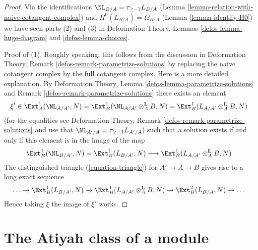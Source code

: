\begin{proof}
Via the identifications $\NL_{B/A} = \tau_{\geq -1}L_{B/A}$
(Lemma \ref{lemma-relation-with-naive-cotangent-complex}) and
$H^0(L_{B/A}) = \Omega_{B/A}$ (Lemma \ref{lemma-identify-H0})
we have seen parts (2) and (3) in
Deformation Theory, Lemmas \ref{defos-lemma-huge-diagram} and
\ref{defos-lemma-choices}.

\medskip\noindent
Proof of (1). Roughly speaking, this follows from the discussion in 
Deformation Theory, Remark \ref{defos-remark-parametrize-solutions}
by replacing the naive cotangent complex by the full cotangent complex.
Here is a more detailed explanation. By
Deformation Theory, Lemma \ref{defos-lemma-parametrize-solutions}
and Remark \ref{defos-remark-parametrize-solutions}
there exists an element
$$
\xi' \in
\Ext^1_A(\NL_{A/A'}, N) =
\Ext^1_B(\NL_{A/A'} \otimes_A^\mathbf{L} B, N) =
\Ext^1_B(L_{A/A'} \otimes_A^\mathbf{L} B, N)
$$
(for the equalities see Deformation Theory, Remark
\ref{defos-remark-parametrize-solutions} and use that
$\NL_{A'/A} = \tau_{\geq -1} L_{A'/A}$)
such that a solution exists if and only if this element is in
the image of the map
$$
\Ext^1_B(\NL_{B/A'}, N) = \Ext^1_B(L_{B/A'}, N)
\longrightarrow
\Ext^1_B(L_{A/A'} \otimes_A^\mathbf{L} B, N)
$$
The distinguished triangle (\ref{equation-triangle})
for $A' \to A \to B$ gives rise to a long exact sequence
$$
\ldots \to
\Ext^1_B(L_{B/A'}, N) \to
\Ext^1_B(L_{A/A'} \otimes_A^\mathbf{L} B, N) \to
\Ext^2_B(L_{B/A}, N) \to \ldots
$$
Hence taking $\xi$ the image of $\xi'$ works.
\end{proof}





\section{The Atiyah class of a module}
\label{section-atiyah}

